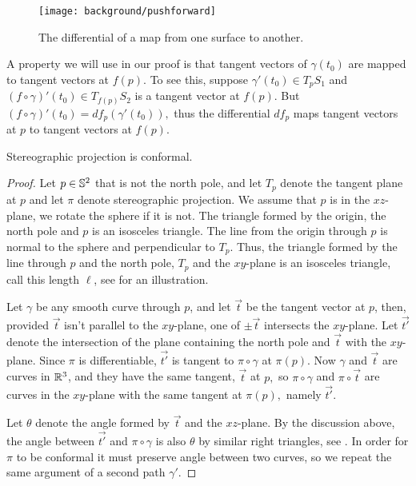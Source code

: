 \begin{figure}[htb]
	\centering
	\texttt{[image: background/pushforward]}
	\caption{The differential of a map from one surface to another.}
	\label{fig:pushforward}
\end{figure}

A property we will use in our proof is that tangent vectors of $\gamma(t_0)$ are mapped
to tangent vectors at $f(p)$. To see this, suppose $\gamma'(t_0)\in T_pS_1$ and
$(f\circ \gamma)'(t_0)\in T_{f(p)}S_2$ is a tangent vector at $f(p)$. But
$(f\circ \gamma)'(t_0)=df_p(\gamma'(t_0)),$ thus the differential $df_p$ maps
tangent vectors at $p$ to tangent vectors at $f(p).$




\begin{theorem}\label{thm:stereo-confroms}
Stereographic projection is conformal.
\end{theorem}
\begin{proof}
	Let $p\in\mathbb{S}^2$ that is not the north pole, and let $T_p$ denote the tangent
	plane at $p$ and let $\pi$ denote stereographic projection.
	 We assume that $p$ is in the $xz$-plane, we rotate the sphere if it is not.
	The triangle formed by the origin, the north pole and $p$
	is an isosceles triangle. 
	The line from the origin through $p$ is normal to the sphere and perpendicular
	to $T_p$. Thus, the triangle formed by the line through $p$ and the north pole,
	$T_p$ and the $xy$-plane is an isosceles triangle, call this length $\ell$, 
	see  for an illustration.
	
	Let $\gamma$ be any smooth curve through $p$, and let $\vec{t}$ be the tangent vector at $p$, then,
	 provided $\vec{t}$ isn't parallel to the $xy$-plane, one of $\pm \vec{t}$
	intersects the $xy$-plane. Let $\vec{t'}$ denote the intersection of the plane containing the north
	pole and $\vec{t}$ with the $xy$-plane. Since $\pi$ is differentiable, $\vec{t'}$ is tangent to $\pi \circ \gamma$ at $\pi(p)$. 
	Now $\gamma$ and $\vec{t}$ are curves in $\mathbb{R}^3$, and they have the same tangent, $\vec{t}$
	at $p,$ so $\pi\circ \gamma$ and $\pi \circ \vec{t}$ are curves in the $xy$-plane with the same
	tangent at $\pi(p),$ namely $\vec{t'}.$
	
	Let $\theta$ denote the angle formed by $\vec{t}$ and the $xz$-plane. 
	By the discussion
	above, the angle between $\vec{t'}$ and $\pi \circ \gamma$ is also $\theta$ by similar right triangles,
	see .
	In order for $\pi$ to be conformal it must preserve angle between two curves, so we repeat 
	the same argument of a second path $\gamma'$.
	
	
\end{proof}

